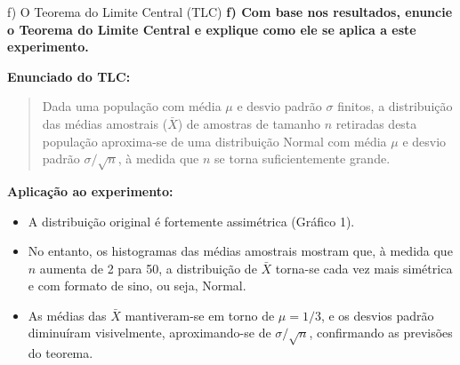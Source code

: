 \begin{frame}{f) O Teorema do Limite Central (TLC)}
    \textbf{f) Com base nos resultados, enuncie o Teorema do Limite Central e explique como ele se aplica a este experimento.}
    
    \textbf{Enunciado do TLC:}
    \begin{quote}
        Dada uma população com média $\mu$ e desvio padrão $\sigma$ finitos, a distribuição das médias amostrais ($\bar{X}$) de amostras de tamanho $n$ retiradas desta população aproxima-se de uma distribuição Normal com média $\mu$ e desvio padrão $\sigma/\sqrt{n}$, à medida que $n$ se torna suficientemente grande.
    \end{quote}
    
    \textbf{Aplicação ao experimento:}
    \begin{itemize}
        \item A distribuição original é fortemente assimétrica (Gráfico 1).
        \item No entanto, os histogramas das médias amostrais mostram que, à medida que $n$ aumenta de 2 para 50, a distribuição de $\bar{X}$ torna-se cada vez mais simétrica e com formato de sino, ou seja, Normal.
        \item As médias das $\bar{X}$ mantiveram-se em torno de $\mu = 1/3$, e os desvios padrão diminuíram visivelmente, aproximando-se de $\sigma/\sqrt{n}$, confirmando as previsões do teorema.
    \end{itemize}
\end{frame}
